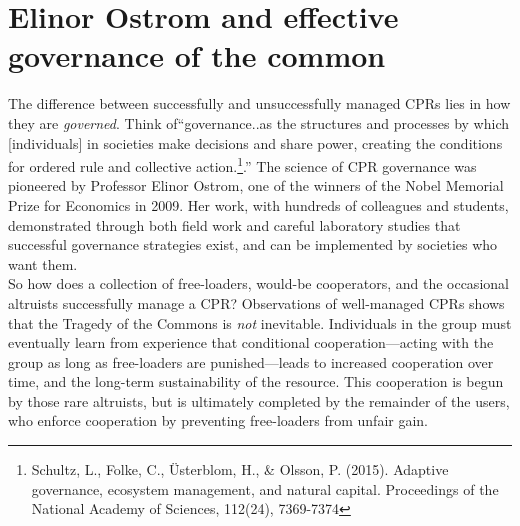 \section{Elinor Ostrom and effective governance of the common}
The difference between successfully and unsuccessfully managed CPRs lies in how they are \emph{governed}. Think of``governance..as the structures and processes by which [individuals] in societies make decisions and share power, creating the conditions for ordered rule and collective action.\footnote{Schultz, L., Folke, C., \"Usterblom, H., \& Olsson, P. (2015). Adaptive governance, ecosystem management, and natural capital. Proceedings of the National Academy of Sciences, 112(24), 7369-7374}.'' The science of CPR governance was pioneered by Professor Elinor Ostrom, one of the winners of the Nobel Memorial Prize for Economics in 2009. Her work, with hundreds of colleagues and students, demonstrated through both field work and careful laboratory studies that successful governance strategies exist, and can be implemented by societies who want them.\\

So how does a collection of free-loaders, would-be cooperators, and the occasional altruists successfully manage a CPR? Observations of well-managed CPRs shows that the Tragedy of the Commons is \emph{not} inevitable.  Individuals in the group must eventually learn from experience that conditional cooperation---acting with the group as long as free-loaders are punished---leads to increased cooperation over time, and the long-term sustainability of the resource. This cooperation is begun by those rare altruists, but is ultimately completed by the remainder of the users, who enforce cooperation by preventing free-loaders from unfair gain. 

